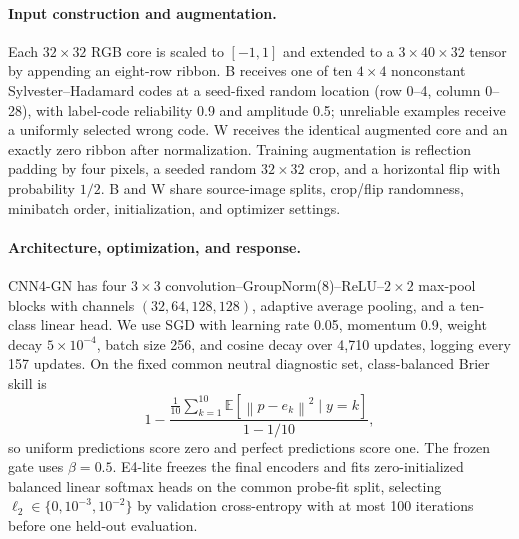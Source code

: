 \documentclass{article}
\theoremstyle{definition}
\theoremstyle{remark}
\newcommand{\norm}[1]{\left\lVert #1\right\rVert}
\begin{document}
\paragraph{Input construction and augmentation.}
Each $32\times32$ RGB core is scaled to $[-1,1]$ and extended to a $3\times40\times32$ tensor by appending an eight-row ribbon. B receives one of ten $4\times4$ nonconstant Sylvester--Hadamard codes at a seed-fixed random location (row 0--4, column 0--28), with label-code reliability 0.9 and amplitude 0.5; unreliable examples receive a uniformly selected wrong code. W receives the identical augmented core and an exactly zero ribbon after normalization. Training augmentation is reflection padding by four pixels, a seeded random $32\times32$ crop, and a horizontal flip with probability $1/2$. B and W share source-image splits, crop/flip randomness, minibatch order, initialization, and optimizer settings.

\paragraph{Architecture, optimization, and response.}
CNN4-GN has four $3\times3$ convolution--GroupNorm(8)--ReLU--$2\times2$ max-pool blocks with channels $(32,64,128,128)$, adaptive average pooling, and a ten-class linear head. We use SGD with learning rate 0.05, momentum 0.9, weight decay $5\times10^{-4}$, batch size 256, and cosine decay over 4,710 updates, logging every 157 updates. On the fixed common neutral diagnostic set, class-balanced Brier skill is
\begin{equation}
  1-\frac{\frac1{10}\sum_{k=1}^{10}\mathbb E[\norm{p-e_k}^2\mid y=k]}{1-1/10},
  \label{eq:app-balanced-brier}
\end{equation}
so uniform predictions score zero and perfect predictions score one. The frozen gate uses $\beta=0.5$. E4-lite freezes the final encoders and fits zero-initialized balanced linear softmax heads on the common probe-fit split, selecting $\ell_2\in\{0,10^{-3},10^{-2}\}$ by validation cross-entropy with at most 100 iterations before one held-out evaluation.
\end{document}
